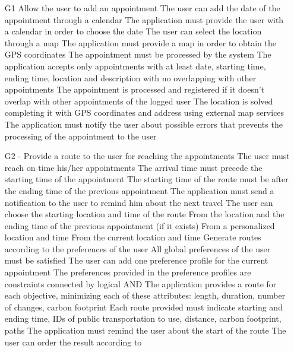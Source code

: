 \begin{itemize}
	\item[G1] Allow the user to add an appointment
	\subitem[G1.1] The user can add the date of the appointment through a calendar
	\subsubitem[R1.1.1]The application must provide the user with a calendar in order to choose the date
	\subitem[G1.2] The user can select the location through a map
	\subsubitem[R1.2.1]The application must provide a map in order to obtain the GPS coordinates
	\subitem[G1.3] The appointment must be processed by the system
	\subsubitem[R1.3.1]The application accepts only appointments with at least date, starting time, ending time, location and description with no overlapping with other appointments
	\subsubitem[R1.3.2]The appointment is processed and registered if it doesn’t overlap with other appointments of the logged user
	\subsubitem[R1.3.3]The location is solved completing it with GPS coordinates and address using external map services
	\subsubitem[R1.3.4]The application must notify the user about possible errors that prevents the processing of the appointment to the user
	\item[G2] - Provide a route to the user for reaching the appointments
	\subitem[G2.1] The user must reach on time his/her appointments
	\subsubitem[R2.1.1]The arrival time must precede the starting time of the appointment
	\subsubitem[R2.1.2]The starting time of the route must be after the ending time of the previous appointment
	\subsubitem[R2.1.3]The application must send a notification to the user to remind him about the next travel
	\subitem[G2.2] The user can choose the starting location and time of the route
	\subsubitem[R2.2.1]From the location and the ending time of the previous appointment (if it exists)
	\subsubitem[R2.2.2]From a personalized location and time
	\subsubitem[R2.2.3]From the current location and time
	\subitem[G2.3] Generate routes according to the preferences of the user
	\subsubitem[R2.3.1]All global preferences of the user must be satisfied
	\subsubitem[R2.3.2]The user can add one preference profile for the current appointment
	\subsubitem[R2.3.3]The preferences provided in the preference profiles are constraints connected by logical AND
	\subitem[G2.4] The application provides a route for each objective, minimizing each of these attributes: length, duration, number of changes, carbon footprint
	\subsubitem[R2.4.1]Each route provided must indicate starting and ending time, IDs of public transportation to use, distance, carbon footprint, paths
	\subsubitem[R2.4.2]The application must remind the user about the start of the route
	\subsubitem[R2.4.3]The user can order the result according to
	\begin{enumerate}


\end{enumerate}
\end{itemize}
